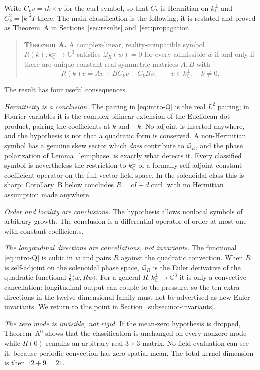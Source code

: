 \documentclass[11pt]{article}
\theoremstyle{definition}
\theoremstyle{remark}
\theoremstyle{plain}
\DeclareMathOperator{\curl}{curl}
\newcommand{\C}{\mathbb{C}}
\newcommand{\Qform}{\mathcal{Q}}
\newcommand{\Ck}{C_k}
\newcommand{\kperp}{k_{\C}^{\perp}}
\begin{document}
Write $\Ck v=ik\times v$ for the curl symbol, so that $\Ck$ is Hermitian on
$\kperp$ and $\Ck^{2}=|k|^{2}I$ there. The main classification is the
following; it is restated and proved as Theorem~A in
Sections~\ref{sec:results} and~\ref{sec:propagation}.

\begin{quote}
\textbf{Theorem A.} A complex-linear, reality-compatible symbol
$R(k):\kperp\to\C^{3}$ satisfies $\Qform_{R}(w)=0$ for every admissible $w$ if
and only if there are unique constant real symmetric matrices $A,B$ with
\[
R(k)v=Av+B\Ck v+\Ck Bv,
\qquad v\in\kperp,\quad k\ne0 .
\]
\end{quote}

The result has four useful consequences.

\emph{Hermiticity is a conclusion.} The pairing in \eqref{eq:intro-Q} is the
real $L^{2}$ pairing; in Fourier variables it is the complex-bilinear extension
of the Euclidean dot product, pairing the coefficients at $k$ and $-k$. No
adjoint is inserted anywhere, and the hypothesis is not that a quadratic form
is conserved. A non-Hermitian symbol has a genuine skew sector which
\emph{does} contribute to $\Qform_{R}$, and the phase polarization of
Lemma~\ref{lem:phase} is exactly what detects it. Every classified symbol is nevertheless the restriction to $\kperp$ of a
formally self-adjoint constant-coefficient operator on the full vector-field
space. In the solenoidal class this is sharp:
Corollary~B below concludes $R=cI+d\curl$ with no Hermitian assumption made
anywhere.

\emph{Order and locality are conclusions.} The hypothesis allows nonlocal
symbols of arbitrary growth. The conclusion is a differential operator of
order at most one with constant coefficients.

\emph{The longitudinal directions are cancellations, not invariants.} The
functional \eqref{eq:intro-Q} is cubic in $w$ and pairs $R$ against the
quadratic convection. When $R$ is self-adjoint on the solenoidal phase space,
$\Qform_{R}$ is the Euler derivative of the quadratic functional
$\tfrac12\langle w,Rw\rangle$. For a general $R:\kperp\to\C^{3}$ it is only a
convective cancellation: longitudinal output can couple to the pressure, so
the ten extra directions in the twelve-dimensional family must not be
advertised as new Euler invariants. We return to this point in
Section~\ref{subsec:not-invariants}.

\emph{The zero mode is invisible, not rigid.} If the mean-zero hypothesis is
dropped, Theorem~A$^{0}$ shows that the classification is unchanged on every
nonzero mode while $R(0)$ remains an arbitrary real $3\times3$ matrix. No
field evaluation can see it, because periodic convection has zero spatial
mean. The total kernel dimension is then $12+9=21$.
\end{document}
